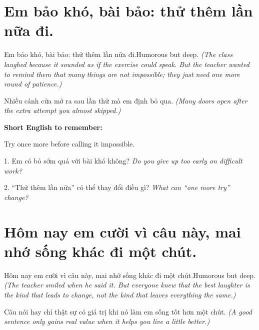 \section{Em bảo khó, bài bảo: thử thêm lần nữa đi.}
\begin{truyen}{Em bảo khó, bài bảo: thử thêm lần nữa đi.}{Humorous but deep.}
\textit{(The class laughed because it sounded as if the exercise could speak. But the teacher wanted to remind them that many things are not impossible; they just need one more round of patience.)}
\end{truyen}

\begin{baihoc}
Nhiều cánh cửa mở ra sau lần thử mà em định bỏ qua.
\textit{(Many doors open after the extra attempt you almost skipped.)}
\end{baihoc}

\begin{ghinhoanh}
\textbf{Short English to remember:}

Try once more before calling it impossible.

\end{ghinhoanh}

\begin{tuhocnhanh}
1. Em có bỏ sớm quá với bài khó không? \textit{Do you give up too early on difficult work?}

2. “Thử thêm lần nữa” có thể thay đổi điều gì? \textit{What can “one more try” change?}
\end{tuhocnhanh}
\ngancach

\section{Hôm nay em cười vì câu này, mai nhớ sống khác đi một chút.}
\begin{truyen}{Hôm nay em cười vì câu này, mai nhớ sống khác đi một chút.}{Humorous but deep.}
\textit{(The teacher smiled when he said it. But everyone knew that the best laughter is the kind that leads to change, not the kind that leaves everything the same.)}
\end{truyen}

\begin{baihoc}
Câu nói hay chỉ thật sự có giá trị khi nó làm em sống tốt hơn một chút.
\textit{(A good sentence only gains real value when it helps you live a little better.)}
\end{baihoc}


